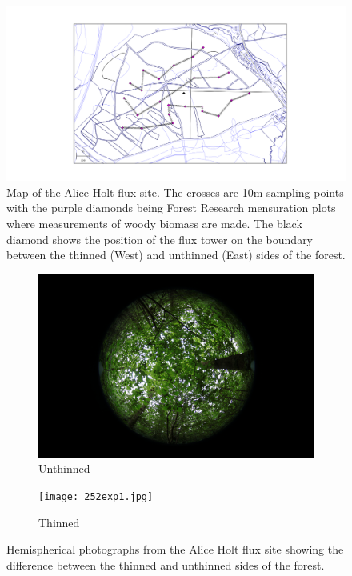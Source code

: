 \documentclass[11pt]{article}
\begin{document}
\begin{figure}[!ht]
    \centering
    \includegraphics[width=1.\textwidth]{straitsmap_threet_10m.png}
    \caption{Map of the Alice Holt flux site. The crosses are 10m sampling points with the purple diamonds being Forest Research mensuration plots where measurements of woody biomass are made. The black diamond shows the position of the flux tower on the boundary between the thinned (West) and unthinned (East) sides of the forest.}
    \label{fig:map}
\end{figure}


\begin{figure}[!h]
\centering
\begin{subfigure}{.5\textwidth}
  \centering
  \includegraphics[width=.7\linewidth]{043exp2.jpg}
  \caption{Unthinned}
  \label{fig:sub1}
\end{subfigure}%
\begin{subfigure}{.5\textwidth}
  \centering
  \texttt{[image: 252exp1.jpg]}
  \caption{Thinned}
  \label{fig:sub2}
\end{subfigure}
\caption{Hemispherical photographs from the Alice Holt flux site showing the difference between the thinned and unthinned sides of the forest.}
\label{fig:hemiphotos}
\end{figure}
\end{document}
